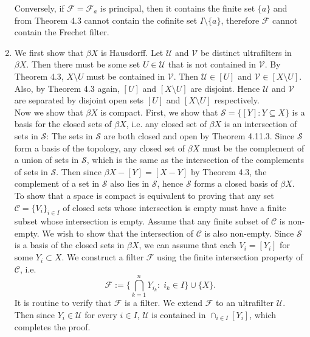 \documentclass{article}
\begin{document}
\begin{enumerate}
    Conversely, if $\mathcal{F}=\mathcal{F}_a$ is principal, then it
    contains the finite set $\{a\}$ and from Theorem 4.3 cannot contain the
    cofinite set $I\setminus\{a\}$, therefore $\mathcal{F}$ cannot contain
    the Frechet filter.

  \item We first show that $\beta X$ is Hausdorff. Let $\mathcal{U}$ and
    $\mathcal{V}$ be distinct ultrafilters in $\beta X$. Then there must be
    some set $U\in\mathcal{U}$ that is not contained in $\mathcal{V}$. By
    Theorem 4.3, $X\setminus U$ must be contained in $\mathcal{V}$. Then
    $\mathcal{U}\in[U]$ and $\mathcal{V}\in[X\setminus U]$. Also, by
    Theorem 4.3 again, $[U]$ and $[X\setminus U]$ are disjoint. Hence
    $\mathcal{U}$ and $\mathcal{V}$ are separated by disjoint open sets
    $[U]$ and $[X\setminus U]$ respectively. \\

    Now we show that $\beta X$ is compact. First, we show that
    $\mathcal{S}=\{[Y]:Y\subseteq X\}$ is a basis for the closed sets of $\beta
    X$, i.e. any closed set of $\beta X$ is an intersection of sets in
    $\mathcal{S}$: The sets in $\mathcal{S}$ are both closed and open by
    Theorem 4.11.3. Since $\mathcal{S}$ form a basis of the topology, any
    closed set of $\beta X$ must be the complement of a union of sets in
    $\mathcal{S}$, which is the same as the intersection of the complements
    of sets in $\mathcal{S}$. Then since $\beta X-[Y]=[X-Y]$ by Theorem
    4.3, the complement of a set in $\mathcal{S}$ also lies in
    $\mathcal{S}$, hence $\mathcal{S}$ forms a closed basis of $\beta X$.
    \\

    To show that a space is compact is equivalent to proving that any set
    $\mathcal{C}=\{V_i\}_{i\in I}$ of closed sets whose intersection is
    empty must have a finite subset whose intersection is empty. Assume
    that any finite subset of $\mathcal{C}$ is non-empty. We wish to show
    that the intersection of $\mathcal{C}$ is also non-empty. Since
    $\mathcal{S}$ is a basis of the closed sets in $\beta X$, we can assume
    that each $V_i=[Y_i]$ for some $Y_i\subset X$. We construct a filter
    $\mathcal{F}$ using the finite intersection property of $\mathcal{C}$,
    i.e.
    \begin{equation*}
      \mathcal{F} := \{\bigcap_{k=1}^n Y_{i_k}:\; i_k\in I\} \cup \{X\}.
    \end{equation*}
    It is routine to verify that $\mathcal{F}$ is a filter. We extend
    $\mathcal{F}$ to an ultrafilter $\mathcal{U}$. Then since
    $Y_i\in\mathcal{U}$ for every $i\in I$, $\mathcal{U}$ is contained in
    $\cap_{i\in I}[Y_i]$, which completes the proof.


\end{enumerate}
\end{document}
